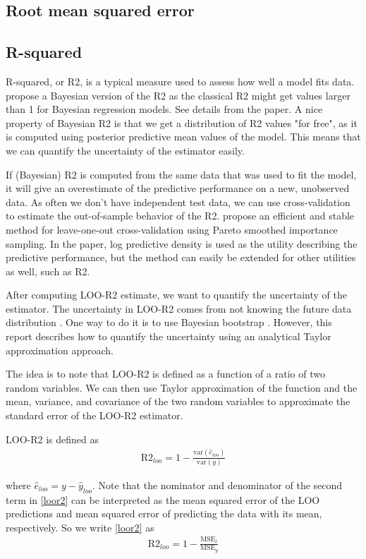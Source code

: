 \documentclass{article}
\begin{document}
\subsection{Root mean squared error}

\subsection{R-squared}
R-squared, or R2, is a typical measure used to assess how well a model fits data. \cite{gelman_r-squared_2019} propose a Bayesian version of the R2 as the classical R2 might get values larger than 1 for Bayesian regression models. See details from the paper. A nice property of Bayesian R2 is that we get a distribution of R2 values "for free", as it is computed using posterior predictive mean values of the model. This means that we can quantify the uncertainty of the estimator easily.

If (Bayesian) R2 is computed from the same data that was used to fit the model, it will give an overestimate of the predictive performance on a new, unobserved data. As often we don't have independent test data, we can use cross-validation to estimate the out-of-sample behavior of the R2. \cite{vehtari_practical_2016} propose an efficient and stable method for leave-one-out cross-validation using Pareto smoothed importance sampling. In the paper, log predictive density is used as the utility describing the predictive performance, but the method can easily be extended for other utilities as well, such as R2.

After computing LOO-R2 estimate, we want to quantify the uncertainty of the estimator. The uncertainty in LOO-R2 comes from not knowing the future data distribution \citep{vehtari_survey_2012}. One way to do it is to use Bayesian bootstrap \citep{rubin_bayesian_1981}. However, this report describes how to quantify the uncertainty using an analytical Taylor approximation approach.

The idea is to note that LOO-R2 is defined as a function of a ratio of two random variables. We can then use Taylor approximation of the function and the mean, variance, and covariance of the two random variables to approximate the standard error of the LOO-R2 estimator. 

LOO-R2 is defined as
\begin{align}
\text{R2}_{loo} = 1 - \frac{\text{var}(\hat{e}_{loo}) }{ \text{var}(y)} \label{loor2}
\end{align}

where $\hat{e}_{loo} = y - \hat{y}_{loo}$. Note that the nominator and denominator of the second term in \eqref{loor2} can be interpreted as the mean squared error of the LOO predictions and mean squared error of predicting the data with its mean, respectively. So we write \eqref{loor2} as 
\begin{align}
    \text{R2}_{loo} = 1 - \frac{\text{MSE}_{\hat{e}} }{ \text{MSE}_y} \label{mser2}
\end{align}
\end{document}
